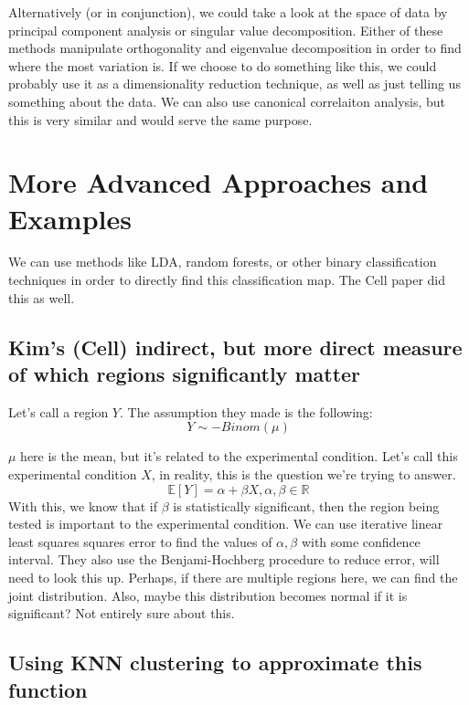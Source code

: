 \documentclass[10.5pt]{article}
\def\R{{\mathbb{R}}}
\begin{document}
Alternatively (or in conjunction), we could take a look at the space of data by principal component analysis or singular value decomposition. Either of these methods manipulate orthogonality and eigenvalue decomposition in order to find where the most variation is. If we choose to do something like this, we could probably use it as a dimensionality reduction technique, as well as just telling us something about the data. We can also use canonical correlaiton analysis, but this is very similar and would serve the same purpose. 

\section{More Advanced Approaches and Examples}
We can use methods like LDA, random forests, or other binary classification techniques in order to directly find this classification map. The Cell paper did this as well. \\


\subsection{Kim's (Cell) indirect, but more direct measure of which regions significantly matter}
Let's call a region $Y$. The assumption they made is the following: 
\begin{equation}
Y\sim -Binom(\mu)
\end{equation}

$\mu$ here is the mean, but it's related to the experimental condition. Let's call this experimental condition $X$, in reality, this is the question we're trying to answer. 
\begin{equation}
\mathbb{E}[Y] = \alpha + \beta X, \alpha, \beta \in \R
\end{equation}
With this, we know that if $\beta$ is statistically significant, then the region being tested is important to the experimental condition. We can use iterative linear least squares squares error to find the values of $\alpha, \beta$ with some confidence interval. They also use the Benjami-Hochberg procedure to reduce error, will need to look this up. Perhaps, if there are multiple regions here, we can find the joint distribution. Also, maybe this distribution becomes normal if it is significant? Not entirely sure about this. 


\subsection{Using KNN clustering to approximate this function}
\end{document}
